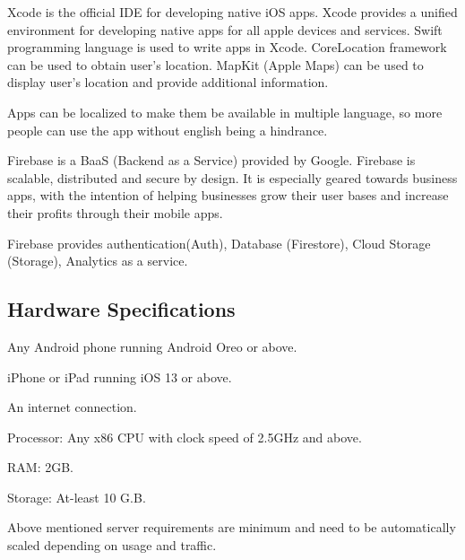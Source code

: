 \documentclass[../Report.tex]{subfiles}
\begin{document}
\begin{description}
  \item[Xcode:] Xcode is the official IDE for developing native iOS apps. Xcode provides a unified environment for developing native apps 
  for all apple devices and services. Swift programming language is used to write apps in Xcode. CoreLocation framework can be used to 
  obtain user's location. MapKit (Apple Maps) can be used to display user's location and provide additional information.\par

  \item Apps can be localized to make them be available in multiple language, so more people can use the app without english being a 
  hindrance.

  \item[Firebase:] Firebase is a BaaS (Backend as a Service) provided by Google. Firebase is scalable, distributed and secure by design. It is especially
  geared towards business apps, with the intention of helping businesses grow their user bases and increase their profits through their mobile apps.\par
  Firebase provides authentication(Auth), Database (Firestore), Cloud Storage (Storage), Analytics as a service.
\end{description}

\subsection{Hardware Specifications}

\begin{description}
  \item[User Device Requirements:]
  \item Any Android phone running Android Oreo or above.
  \item iPhone or iPad running iOS 13 or above.
  \item An internet connection.
  \item 
  
  \item [Minimum Server Requirements:]
  \item Processor: Any x86 CPU with clock speed of 2.5GHz and above.
  \item RAM: 2GB.
  \item Storage: At-least 10 G.B.
\end{description}
Above mentioned server requirements are minimum and need to be automatically scaled depending on usage and traffic.
\end{document}
